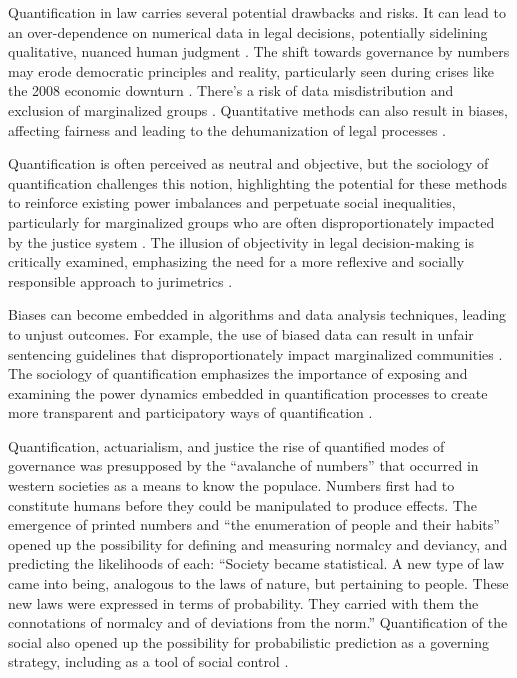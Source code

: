 Quantification in law carries several potential drawbacks and risks. It can lead to an over-dependence on numerical data in legal decisions, potentially sidelining qualitative, nuanced human judgment \cite{ribeiro2021,ribeiro2021}. The shift towards governance by numbers may erode democratic principles and reality, particularly seen during crises like the 2008 economic downturn \cite{ant2019}. There's a risk of data misdistribution and exclusion of marginalized groups \cite{sareen2020}. Quantitative methods can also result in biases, affecting fairness and leading to the dehumanization of legal processes \cite{lynch2019, ribeiro2021}.

Quantification is often perceived as neutral and objective, but the sociology of quantification challenges this notion, highlighting the potential for these methods to reinforce existing power imbalances and perpetuate social inequalities, particularly for marginalized groups who are often disproportionately impacted by the justice system \cite{10.1007/978-3-319-44000-215,10.3390/fi9040068}. The illusion of objectivity in legal decision-making is critically examined, emphasizing the need for a more reflexive and socially responsible approach to jurimetrics \cite{10.1007/978-3-319-44000-215,10.3390/fi9040068}.

Biases can become embedded in algorithms and data analysis techniques, leading to unjust outcomes. For example, the use of biased data can result in unfair sentencing guidelines that disproportionately impact marginalized communities \cite{10.1590/dados.2022.65.3.267,10.1057/s41599-020-00557-0}. The sociology of quantification emphasizes the importance of exposing and examining the power dynamics embedded in quantification processes to create more transparent and participatory ways of quantification \cite{10.1057/s41599-020-00557-0}.

Quantification, actuarialism, and justice the rise of quantified modes of governance was presupposed by the “avalanche of numbers” that occurred in western societies as a means to know the populace. Numbers first had to constitute humans before they could be manipulated to produce effects. The emergence of printed numbers and “the enumeration of people and their habits” opened up the possibility for defining and measuring normalcy and deviancy, and predicting the likelihoods of each: “Society became statistical. A new type of law came into being, analogous to the laws of nature, but pertaining to people. These new laws were expressed in terms of probability. They carried with them the connotations of normalcy and of deviations from the norm.” Quantification of the social also opened up the possibility for probabilistic prediction as a governing strategy, including as a tool of social control \cite{101111lsi12334}.


